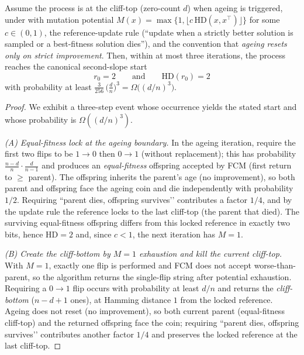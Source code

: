 \documentclass[lettersize,journal]{IEEEtran}
\newcommand{\HD}{\text{HD}}
\begin{document}
\begin{lemma}\label{lem:can-start-omega-d3}
	Assume the process is at the cliff-top (zero-count $d$) when ageing is triggered, under \IPHfcm{} with mutation potential $M(x)=\max\{1,\lfloor c\,\HD(x,x^\top)\rfloor\}$ for some $c\in(0,1)$, the reference-update rule (“update when a strictly better solution is sampled or a best-fitness solution dies”), and the convention that \emph{ageing resets only on strict improvement}. Then, within at most three iterations, the process reaches the canonical second-slope start
	\[
	r_0=2\qquad\text{and}\qquad \HD(r_0)=2
	\]
	with probability at least $\displaystyle \frac{3}{256}\,\bigl(\tfrac{d}{n}\bigr)^{3}=\Omega\!\bigl((d/n)^3\bigr)$.
\end{lemma}

\begin{proof}
	We exhibit a three-step event whose occurrence yields the stated start and whose probability is $\Omega((d/n)^3)$.
	
	\emph{(A) Equal-fitness lock at the ageing boundary.} In the ageing iteration, require the first two flips to be $1\!\to 0$ then $0\!\to 1$ (without replacement); this has probability $\frac{n-d}{n}\cdot\frac{d}{n-1}$ and produces an \emph{equal-fitness} offspring accepted by FCM (first return to $\ge$ parent). The offspring inherits the parent’s age (no improvement), so both parent and offspring face the ageing coin and die independently with probability $1/2$. Requiring “parent dies, offspring survives’’ contributes a factor $1/4$, and by the update rule the reference locks to the last cliff-top (the parent that died). The surviving equal-fitness offspring differs from this locked reference in exactly two bits, hence $\HD=2$ and, since $c<1$, the next iteration has $M=1$.
	
	\emph{(B) Create the cliff-bottom by $M{=}1$ exhaustion and kill the current cliff-top.} With $M=1$, exactly one flip is performed and FCM does not accept worse-than-parent, so the algorithm returns the single-flip string after potential exhaustion. Requiring a $0\!\to 1$ flip occurs with probability at least $d/n$ and returns the \emph{cliff-bottom} ($n-d+1$ ones), at Hamming distance $1$ from the locked reference. Ageing does not reset (no improvement), so both current parent (equal-fitness cliff-top) and the returned offspring face the coin; requiring “parent dies, offspring survives’’ contributes another factor $1/4$ and preserves the locked reference at the last cliff-top.
	

\end{proof}
\end{document}
